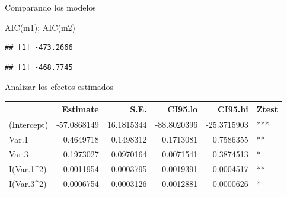 \documentclass[
  11pt,
  ignorenonframetext,
]{beamer}
\newenvironment{Shaded}{}{}
\newcommand{\DecValTok}[1]{\textcolor[rgb]{0.25,0.63,0.44}{#1}}
\newcommand{\FunctionTok}[1]{\textcolor[rgb]{0.02,0.16,0.49}{#1}}
\newcommand{\NormalTok}[1]{#1}
\newcommand{\OtherTok}[1]{\textcolor[rgb]{0.00,0.44,0.13}{#1}}
\newcommand{\SpecialCharTok}[1]{\textcolor[rgb]{0.25,0.44,0.63}{#1}}
\begin{document}
\begin{frame}[fragile]{Comparando los modelos}
\protect\hypertarget{comparando-los-modelos}{}
\begin{Shaded}
\begin{Highlighting}[]
\FunctionTok{AIC}\NormalTok{(m1); }\FunctionTok{AIC}\NormalTok{(m2)}
\end{Highlighting}
\end{Shaded}

\begin{verbatim}
## [1] -473.2666
\end{verbatim}

\begin{verbatim}
## [1] -468.7745
\end{verbatim}
\end{frame}

\begin{frame}[fragile]{Analizar los efectos estimados}
\protect\hypertarget{analizar-los-efectos-estimados}{}
\begin{Shaded}
\end{Shaded}

\begin{longtable}[]{@{}lrrrrl@{}}
\toprule()
& Estimate & S.E. & CI95.lo & CI95.hi & Ztest \\
\midrule()
\endhead
(Intercept) & -57.0868149 & 16.1815344 & -88.8020396 & -25.3715903 &
*** \\
Var.1 & 0.4649718 & 0.1498312 & 0.1713081 & 0.7586355 & ** \\
Var.3 & 0.1973027 & 0.0970164 & 0.0071541 & 0.3874513 & * \\
I(Var.1\^{}2) & -0.0011954 & 0.0003795 & -0.0019391 & -0.0004517 & ** \\
I(Var.3\^{}2) & -0.0006754 & 0.0003126 & -0.0012881 & -0.0000626 & * \\
\bottomrule()
\end{longtable}
\end{frame}
\end{document}
